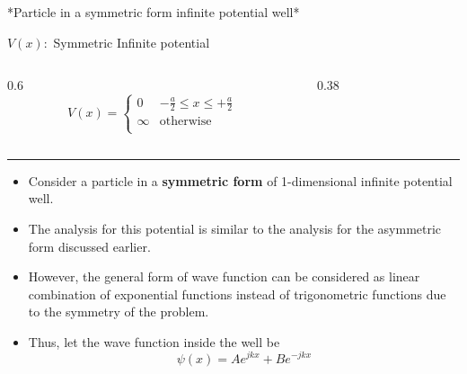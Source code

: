 %
\begin{frame}
	\begin{huge}
		\begin{center}
			*Particle in a symmetric form infinite potential well*
		\end{center}
	\end{huge}
\end{frame}
%
%
\begin{frame}{\(V(x) :\) Symmetric Infinite potential}
	\begin{columns}
		\begin{column}{0.6\textwidth}
			\[
			V(x) =  \left\{\begin{array}{ll}
				0	&	-\frac{a}{2} \leq x \leq +\frac{a}{2}	\\
				\infty		&	\text{otherwise}	\\
			\end{array}\right.
			\]
		\end{column}
		\begin{column}{0.38\textwidth}
		\end{column}
	\end{columns}
	\hrule
	\begin{itemize}
		\item Consider a particle in a \textbf{symmetric form} of 1-dimensional infinite potential well.
		\item The analysis for this potential is similar to the analysis for the asymmetric form discussed earlier.
		\item However, the general form of wave function can be considered as linear combination of exponential functions instead of trigonometric functions due to the symmetry of the problem.
		\item Thus, let the wave function inside the well be
		\[
		\psi(x)  = A e^{j k x} + B e^{-j k x}
		\]
	\end{itemize}
\end{frame}
